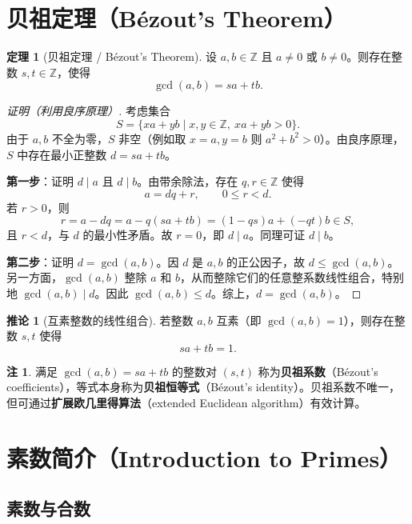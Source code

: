 \documentclass[UTF8,11pt,a4paper]{ctexbook}   %
\theoremstyle{definition}
\newtheorem{theorem}{定理}[section]
\newtheorem{remark}{注}[section]
\newtheorem{corollary}{推论}[section]
\begin{document}
\section{贝祖定理（Bézout's Theorem）}

\begin{theorem}[贝祖定理 / Bézout's Theorem]
设 $a,b\in\mathbb{Z}$ 且 $a\neq 0$ 或 $b\neq 0$。则存在整数 $s,t\in\mathbb{Z}$，使得
\[
\gcd(a,b)=sa+tb.
\]
\end{theorem}

\begin{proof}[证明（利用良序原理）]
考虑集合
\[
S=\{xa+yb \mid x,y\in\mathbb{Z},\ xa+yb>0\}.
\]
由于 $a,b$ 不全为零，$S$ 非空（例如取 $x=a,y=b$ 则 $a^2+b^2>0$）。由良序原理，$S$ 中存在最小正整数 $d=s a+t b$。

\textbf{第一步}：证明 $d\mid a$ 且 $d\mid b$。由带余除法，存在 $q,r\in\mathbb{Z}$ 使得
\[
a=dq+r,\qquad 0\le r<d.
\]
若 $r>0$，则
\[
r=a-dq=a-q(sa+tb)=(1-qs)a+(-qt)b\in S,
\]
且 $r<d$，与 $d$ 的最小性矛盾。故 $r=0$，即 $d\mid a$。同理可证 $d\mid b$。

\textbf{第二步}：证明 $d=\gcd(a,b)$。因 $d$ 是 $a,b$ 的正公因子，故 $d\le\gcd(a,b)$。另一方面，$\gcd(a,b)$ 整除 $a$ 和 $b$，从而整除它们的任意整系数线性组合，特别地 $\gcd(a,b)\mid d$。因此 $\gcd(a,b)\le d$。综上，$d=\gcd(a,b)$。
\end{proof}

\begin{corollary}[互素整数的线性组合]
若整数 $a,b$ 互素（即 $\gcd(a,b)=1$），则存在整数 $s,t$ 使得
\[
sa+tb=1.
\]
\end{corollary}

\begin{remark}
满足 $\gcd(a,b)=sa+tb$ 的整数对 $(s,t)$ 称为\textbf{贝祖系数}（Bézout's coefficients），等式本身称为\textbf{贝祖恒等式}（Bézout's identity）。贝祖系数不唯一，但可通过\textbf{扩展欧几里得算法}（extended Euclidean algorithm）有效计算。
\end{remark}

\section{素数简介（Introduction to Primes）}

\subsection{素数与合数}
\end{document}

